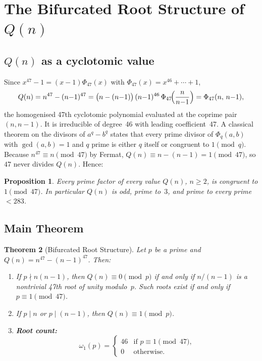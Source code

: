 ﻿\documentclass[11pt,a4paper]{article}
\newtheorem{theorem}{Theorem}[section]
\newtheorem{proposition}[theorem]{Proposition}
\begin{document}
\section{The Bifurcated Root Structure of $Q(n)$}\label{sec:roots}

\subsection{$Q(n)$ as a cyclotomic value}

Since $x^{47} - 1 = (x-1)\Phi_{47}(x)$ with $\Phi_{47}(x) = x^{46} + \cdots + 1$,
\begin{equation}\label{eq:cyclo}
  Q(n) = n^{47} - (n{-}1)^{47}
       = \bigl(n - (n{-}1)\bigr)\,(n{-}1)^{46}\,\Phi_{47}\!\Bigl(\frac{n}{n{-}1}\Bigr)
       = \Phi_{47}(n,\, n{-}1),
\end{equation}
the homogenised 47th cyclotomic polynomial evaluated at the coprime pair
$(n, n{-}1)$.  It is irreducible of degree~46 with leading coefficient~47.
A classical theorem on the divisors of $a^q - b^q$
\cite{BirkhoffVandiver1904,Washington1997} states that every prime divisor
of $\Phi_q(a,b)$ with $\gcd(a,b) = 1$ and $q$ prime is either $q$ itself or
congruent to $1 \pmod q$.  Because $n^{47} \equiv n \pmod{47}$ by Fermat,
$Q(n) \equiv n - (n{-}1) = 1 \pmod{47}$, so $47$ never divides $Q(n)$.  Hence:

\begin{proposition}\label{prop:divisors}
Every prime factor of every value $Q(n)$, $n \geq 2$, is congruent to
$1 \pmod{47}$.  In particular $Q(n)$ is odd, prime to~$3$, and prime to every
prime $< 283$.
\end{proposition}

\subsection{Main Theorem}

\begin{theorem}[Bifurcated Root Structure]\label{thm:roots}
Let $p$ be a prime and $Q(n) = n^{47} - (n{-}1)^{47}$.  Then:
\begin{enumerate}[label=(\alph*)]
  \item If $p \nmid n(n{-}1)$, then $Q(n) \equiv 0 \pmod{p}$
    if and only if $n/(n{-}1)$ is a nontrivial 47th root of unity modulo~$p$.
    Such roots exist if and only if $p \equiv 1 \pmod{47}$.
  \item If $p \mid n$ or $p \mid (n{-}1)$, then $Q(n) \equiv 1 \pmod{p}$.
  \item \textbf{Root count:}
    \begin{equation}\label{eq:rootcount}
      \omega_1(p) =
      \begin{cases}
        46 & \text{if } p \equiv 1 \pmod{47}, \\
        0  & \text{otherwise.}
      \end{cases}
    \end{equation}
\end{enumerate}
\end{theorem}
\end{document}
